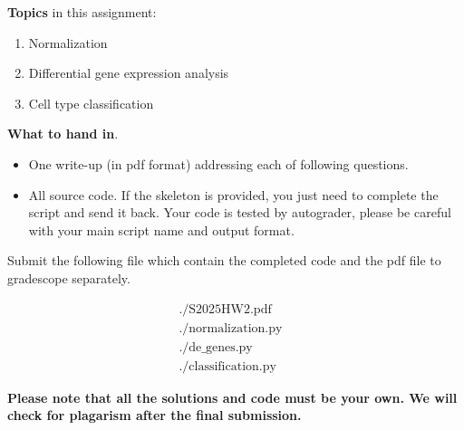 \noindent 
{\bf Topics} in this assignment: 
\begin{enumerate}
\item Normalization
\item Differential gene expression analysis
\item Cell type classification
\end{enumerate}
\vspace{0.2in}


\noindent 
{\bf What to hand in}. 
\begin{itemize}
\item One write-up (in pdf format) addressing each of following questions.
\item All source code. If the skeleton is provided, you just need to complete the script and send it back. Your code is tested by autograder, please be careful with your main script name and output format.
\end{itemize}

Submit the following file which contain the completed code and the
pdf file to gradescope separately. 

\[
  \begin{array}{lllll}
    ./\text{S2025HW2.pdf}&  \\
    ./\text{normalization.py}& \\
    ./\text{de\_genes.py}& \\
    ./\text{classification.py}&
  \end{array}
\]

\textbf{ Please note that all the solutions and code must be your own. We will check for plagarism after the final submission. } 